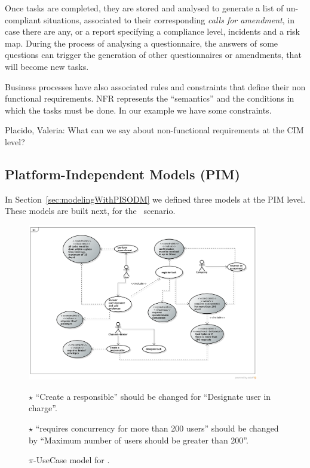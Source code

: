 Once tasks are completed, they are stored and analysed to generate a list of un-compliant situations, associated to their corresponding \textit{calls for amendment}, in case there are any, or a report specifying a compliance level, incidents and a risk map.
During the process of analysing a questionnaire, the answers of some questions can trigger the generation of other questionnaires or amendments, that will become new tasks.  

Business processes have also associated rules and constraints that define their non functional requirements.
NFR represents the ``semantics'' and the conditions in which the tasks must be done.
In our example we have some constraints.

{\color{red}
Placido, Valeria: What can we say about non-functional requirements at the CIM level?
}

\subsection{Platform-Independent Models (PIM)}

In Section~\ref{sec:modelingWithPISODM} we defined three models at the PIM level.
These models are built next, for the \FlyingPig\ scenario.

\begin{figure}[t]
\centering
\includegraphics[width=0.9\textwidth]{figs/UseCaseGeneral.png}

{\color{red} \raggedright
$\star$ ``Create a responsible'' should be changed for ``Designate user in charge''.

$\star$ ``requires concurrency for more than 200 users'' should be changed by ``Maximum number of users should be greater than 200''.
}
\caption{$\pi$-UseCase model for \FlyingPig.\label{fig:piUseCaseModel}}
\end{figure}


